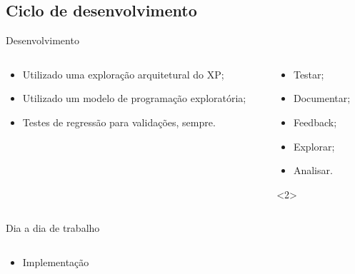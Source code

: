 \subsection{Ciclo de desenvolvimento}
\begin{frame}{Desenvolvimento}
  \begin{columns}
    \begin{column}{5cm}
      \begin{itemize}
      \item <1- | alert@1> Utilizado uma exploração arquitetural do XP;
      \item <2- | alert@2> Utilizado um modelo de programação exploratória;
      \item <3- | alert@3> Testes de regressão para validações, sempre.
      \end{itemize}
    \end{column}
    \begin{column}{5cm}
      \begin{itemize}
        \item <1> Testar;
        \item <1> Documentar;
        \item <1> Feedback;
        \item <1> Explorar;
        \item <1> Analisar.
      \end{itemize}
      <2>
    \end{column}
  \end{columns}
\end{frame}

\begin{frame}{Dia a dia de trabalho}
  \begin{columns}
    \begin{column}{5cm}
      \begin{itemize}
        \item Implementação
      \end{itemize}  
    \end{column}
      \begin{column}{5cm}
      \end{column}
  \end{columns}
\end{frame}

